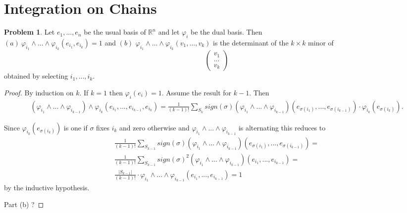 \documentclass[20pt]{article}
\theoremstyle{plain}
\theoremstyle{definition}
\newtheorem*{problem}{Problem}
\begin{document}
\break
\section{Integration on Chains}



\begin{problem}{4.1}
  Let $e_1, ..., e_n$ be the usual basis of $\mathbb{R}^n$ and let $\varphi_i$ be the dual basis.
  Then \\
  $(a) \ \varphi_{i_1} \wedge ... \wedge \varphi_{i_k} (e_{i_1}, e_{i_k}) = 1$ and
  $(b)$ $\varphi_{i_1} \wedge ... \wedge \varphi_{i_k}(v_1, ..., v_k)$ is the determinant of 
  the $k \times k$ minor of 
  $$\begin{pmatrix}v_1 \\ ...\\ v_k\end{pmatrix}$$
  obtained by selecting $i_1, ..., i_k$.
\end{problem}

\begin{proof}
  By induction on $k$.
  If $k = 1$ then $\varphi_i(e_i) = 1.$
  Assume the result for $k-1$. Then
  \begin{align*}
    (\varphi_{i_{1}} \wedge ... \wedge \varphi_{i_{k-1}}) \wedge \varphi_{i_{k}}
    (e_{i_1}, ..., e_{i_{k-1}}, e_{i_{k}})=
    \frac{1}{(k-1)!} \sum_{S_k}sign(\sigma)(\varphi_{i_{1}} \wedge ... \wedge \varphi_{i_{k-1}})(e_{\sigma(i_1)}, ..., e_{\sigma(i_{k-1})}) \cdot
     \varphi_{i_{k}}(e_{\sigma(i_k)}).
  \end{align*}

  Since $\varphi_{i_{k}}(e_{\sigma(i_k)})$ is one if $\sigma$ fixes $i_k$ and zero otherwise and
  $\varphi_{i_{1}} \wedge ... \wedge \varphi_{i_{k-1}}$ is alternating this reduces to 
  \begin{align*}
    \frac{1}{(k-1)!} \sum_{S_{k-1}}sign(\sigma)(\varphi_{i_{1}} \wedge ... \wedge \varphi_{i_{k-1}})(e_{\sigma(i_1)}, ..., e_{\sigma(i_{k-1})}) = \\
    \frac{1}{(k-1)!} \sum_{S_{k-1}}sign(\sigma)^2(\varphi_{i_{1}} \wedge ... \wedge \varphi_{i_{k-1}})(e_{i_1}, ..., e_{i_{k-1}}) = \\
    \frac{|S_{k-1}|}{(k-1)!} \cdot  \varphi_{i_{1}} \wedge ... \wedge \varphi_{i_{k-1}} (e_{i_1}, ..., e_{i_{k-1}}) = 1
  \end{align*}
  by the inductive hypothesis.

  \color{ForestGreen} Part (b) ?
\end{proof}
\end{document}
